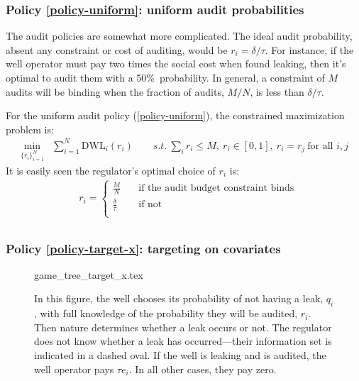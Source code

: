 \documentclass[12pt,oneside,letterpaper]{article}
\theoremstyle{definition}
\begin{document}
\begin{refsection}
\subsubsection{Policy \ref{policy-uniform}: uniform audit probabilities}
The audit policies are somewhat more complicated.
The ideal audit probability, absent any constraint or cost of auditing, would be \(r_i = \delta / \tau\).
For instance, if the well operator must pay two times the social cost when found leaking, then it's optimal to audit them with a 50\%~probability.
In general, a constraint  of \(M\) audits will be binding when the fraction of audits, \(M / N\), is less than \(\delta / \tau\).

For the uniform audit policy (\ref{policy-uniform}), the constrained maximization problem is:
\begin{align*}
\min_{\{r_i\}^{N}_{i=1}} &  \sum^{N}_{i=1} \text{DWL}_i(r_i) \qquad
\textit{s.t.}\ \sum_i r_i \leq M,\ r_i \in [0,1],\ r_i = r_j \ \text{for all } i,j
\end{align*}
It is easily seen the regulator's optimal choice of \(r_i\) is:
\begin{align*}
& r_i = \begin{cases}
  \frac{M}{N} & \quad \text{if the audit budget constraint binds} \\[5pt]
  \frac{\delta}{\tau}  & \quad \text{if not}\\[5pt]
\end{cases}\\
\end{align*}


\subsubsection{Policy \ref{policy-target-x}: targeting on covariates}

\begin{figure}[!bth]
{game_tree_target_x.tex} %

\begin{minipage}{0.75\textwidth}

\begin{justify}
{\small
In this figure, the well chooses its probability of not having a leak, \(q_i\), with full knowledge of the probability they will be audited, \(r_i\).
Then nature determines whether a leak occurs or not.
The regulator does not know whether a leak has occurred---their information set is indicated in a dashed oval.
If the well is leaking and is audited, the well operator pays \(\tau e_i\).
In all other cases, they pay zero.
}
\end{justify}
\end{minipage}
\end{figure}


\end{refsection}
\end{document}
